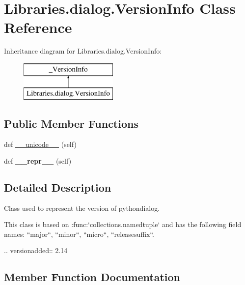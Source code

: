\hypertarget{class_libraries_1_1dialog_1_1_version_info}{}\section{Libraries.\+dialog.\+Version\+Info Class Reference}
\label{class_libraries_1_1dialog_1_1_version_info}
Inheritance diagram for Libraries.\+dialog.\+Version\+Info\+:\begin{figure}[H]
\begin{center}
\leavevmode
\includegraphics[height=2.000000cm]{class_libraries_1_1dialog_1_1_version_info}
\end{center}
\end{figure}
\subsection*{Public Member Functions}
\begin{DoxyCompactItemize}
\item 
def \hyperlink{class_libraries_1_1dialog_1_1_version_info_a6d51bde0f672b8102f2730e820a00dba}{\+\_\+\+\_\+unicode\+\_\+\+\_\+} (self)
\item 
def {\bfseries \+\_\+\+\_\+repr\+\_\+\+\_\+} (self)\hypertarget{class_libraries_1_1dialog_1_1_version_info_af71e52a034c6091bb3ed9cc1e02d8665}{}\label{class_libraries_1_1dialog_1_1_version_info_af71e52a034c6091bb3ed9cc1e02d8665}

\end{DoxyCompactItemize}


\subsection{Detailed Description}
\begin{DoxyVerb}Class used to represent the version of pythondialog.

This class is based on :func:`collections.namedtuple` and has the
following field names: ``major``, ``minor``, ``micro``,
``releasesuffix``.

.. versionadded:: 2.14
\end{DoxyVerb}
 

\subsection{Member Function Documentation}
